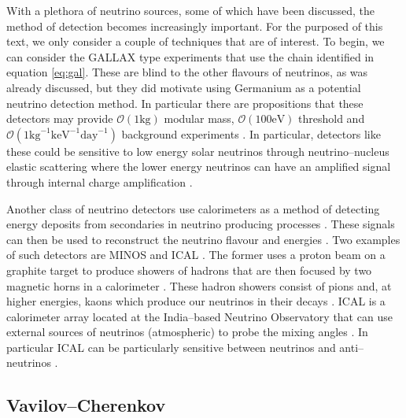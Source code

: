 With a plethora of neutrino sources, some of which have been discussed, the method of detection becomes increasingly important. For the purposed of this text, we only consider a couple of techniques that are of interest. To begin, we can consider the GALLAX type experiments that use the chain identified in equation \ref{eq:gal}. These are blind to the other flavours of neutrinos, as was already discussed, but they did motivate using Germanium as a potential neutrino detection method. In particular there are propositions that these detectors may provide $\mathcal{O}(1 \text{kg})$ modular mass, $\mathcal{O}(100 \text{eV})$ threshold and $\mathcal{O}(1 \text{kg}^{-1}\text{keV}^{-1}\text{day}^{-1})$ background experiments \cite{som_germ}. In particular, detectors like these could be sensitive to low energy solar neutrinos through neutrino--nucleus elastic scattering \cite{germ_low} where the lower energy neutrinos can have an amplified signal through internal charge amplification \cite{germ_low}.

Another class of neutrino detectors use calorimeters as a method of detecting energy deposits from secondaries in neutrino producing processes \cite{minos,ical}. These signals can then be used to reconstruct the neutrino flavour and energies \cite{minos,ical}. Two examples of such detectors are MINOS \cite{minos} and ICAL \cite{ical}. The former uses a proton beam on a graphite target to produce showers of hadrons that are then focused by two magnetic horns in a calorimeter \cite{minos}. These hadron showers consist of pions and, at higher energies, kaons which produce our neutrinos in their decays \cite{minos}. ICAL is a calorimeter array located at the India--based Neutrino Observatory \cite{ical} that can use external sources of neutrinos (atmospheric) to probe the mixing angles \cite{ical}. In particular ICAL can be particularly sensitive between neutrinos and anti--neutrinos \cite{ical}.

\subsection{Vavilov--Cherenkov}

